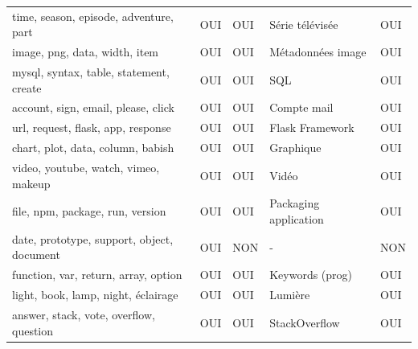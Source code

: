 \begin{longtable}{lllll}
\scriptsize time, season, episode, adventure, part             & \cellcolor[HTML]{9AFF99}OUI & \cellcolor[HTML]{9AFF99}OUI & Série télévisée           & \cellcolor[HTML]{9AFF99}OUI \\
\scriptsize image, png, data, width, item                      & \cellcolor[HTML]{9AFF99}OUI & \cellcolor[HTML]{9AFF99}OUI & Métadonnées image         & \cellcolor[HTML]{9AFF99}OUI \\
\scriptsize mysql, syntax, table, statement, create            & \cellcolor[HTML]{9AFF99}OUI & \cellcolor[HTML]{9AFF99}OUI & SQL                       & \cellcolor[HTML]{9AFF99}OUI \\
\scriptsize account, sign, email, please, click                & \cellcolor[HTML]{9AFF99}OUI & \cellcolor[HTML]{9AFF99}OUI & Compte mail               & \cellcolor[HTML]{9AFF99}OUI \\
\scriptsize url, request, flask, app, response                 & \cellcolor[HTML]{9AFF99}OUI & \cellcolor[HTML]{9AFF99}OUI & Flask Framework           & \cellcolor[HTML]{9AFF99}OUI \\
\scriptsize chart, plot, data, column, babish                  & \cellcolor[HTML]{9AFF99}OUI & \cellcolor[HTML]{9AFF99}OUI & Graphique                 & \cellcolor[HTML]{9AFF99}OUI \\
\scriptsize video, youtube, watch, vimeo, makeup               & \cellcolor[HTML]{9AFF99}OUI & \cellcolor[HTML]{9AFF99}OUI & Vidéo                     & \cellcolor[HTML]{9AFF99}OUI \\
\scriptsize file, npm, package, run, version                   & \cellcolor[HTML]{9AFF99}OUI & \cellcolor[HTML]{9AFF99}OUI & Packaging application     & \cellcolor[HTML]{9AFF99}OUI \\
\scriptsize date, prototype, support, object, document         & \cellcolor[HTML]{9AFF99}OUI & \cellcolor[HTML]{FFCCC9}NON & -                         & \cellcolor[HTML]{FFCCC9}NON \\
\scriptsize function, var, return, array, option               & \cellcolor[HTML]{9AFF99}OUI & \cellcolor[HTML]{9AFF99}OUI & Keywords (prog)           & \cellcolor[HTML]{9AFF99}OUI \\
\scriptsize light, book, lamp, night, éclairage                & \cellcolor[HTML]{9AFF99}OUI & \cellcolor[HTML]{9AFF99}OUI & Lumière                   & \cellcolor[HTML]{9AFF99}OUI \\
\scriptsize answer, stack, vote, overflow, question            & \cellcolor[HTML]{9AFF99}OUI & \cellcolor[HTML]{9AFF99}OUI & StackOverflow             & \cellcolor[HTML]{9AFF99}OUI \\

\end{longtable}
